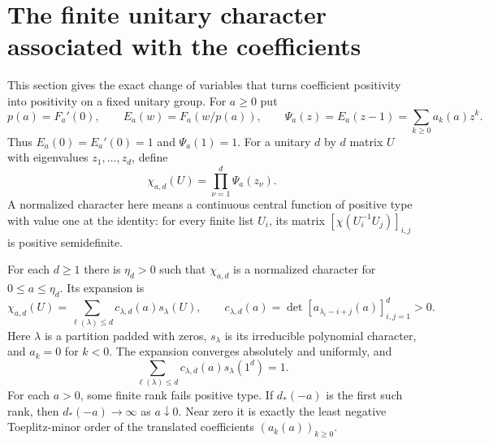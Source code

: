 \section{The finite unitary character associated with the coefficients}
\label{sec:fd-unitary}
This section gives the exact change of variables that turns coefficient positivity into positivity on a fixed unitary group.
For \(a\ge0\) put
\[
 p(a)=F_a'(0),\qquad E_a(w)=F_a(w/p(a)),\qquad
 \Psi_a(z)=E_a(z-1)=\sum_{k\ge0}a_k(a)z^k.
\]
Thus \(E_a(0)=E_a'(0)=1\) and \(\Psi_a(1)=1\).
For a unitary \(d\) by \(d\) matrix \(U\) with eigenvalues
\(z_1,\ldots,z_d\), define
\[
 \chi_{a,d}(U)=\prod_{\nu=1}^d\Psi_a(z_\nu).
\]
A normalized character here means a continuous central function of
positive type with value one at the identity: for every finite list
\(U_i\), its matrix \([\chi(U_i^{-1}U_j)]_{i,j}\) is positive
semidefinite.

\begin{proposition}
\label{prop:fd-unitary}
For each \(d\ge1\) there is \(\eta_d>0\) such that \(\chi_{a,d}\)
is a normalized character for \(0\le a\le\eta_d\). Its expansion is
\[
 \chi_{a,d}(U)=\sum_{\ell(\lambda)\le d}
   c_{\lambda,d}(a)s_\lambda(U),\qquad
 c_{\lambda,d}(a)=\det[a_{\lambda_i-i+j}(a)]_{i,j=1}^d>0.
\]
Here \(\lambda\) is a partition padded with zeros, \(s_\lambda\)
is its irreducible polynomial character, and \(a_k=0\) for \(k<0\).
The expansion converges absolutely and uniformly, and
\[
 \sum_{\ell(\lambda)\le d}c_{\lambda,d}(a)s_\lambda(1^d)=1.
\]
For each \(a>0\), some finite rank fails positive type. If \(d_*(-a)\)
is the first such rank, then \(d_*(-a)\to\infty\) as \(a\downarrow0\).
Near zero it is exactly the least negative Toeplitz-minor order
of the translated coefficients \((a_k(a))_{k\ge0}\).
\end{proposition}

